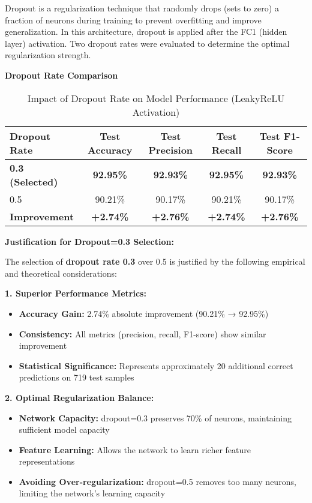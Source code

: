 \documentclass[12pt,a4paper]{article}
\begin{document}
Dropout is a regularization technique that randomly drops (sets to zero) a fraction of neurons during training to prevent overfitting and improve generalization. In this architecture, dropout is applied after the FC1 (hidden layer) activation. Two dropout rates were evaluated to determine the optimal regularization strength.

\textbf{Dropout Rate Comparison}

\begin{table}[H]
\centering
\caption{Impact of Dropout Rate on Model Performance (LeakyReLU Activation)}
\begin{tabular}{lcccc}
\toprule
\textbf{Dropout Rate} & \textbf{Test Accuracy} & \textbf{Test Precision} & \textbf{Test Recall} & \textbf{Test F1-Score} \\
\midrule
\textbf{0.3 (Selected)} & \textbf{92.95\%} & \textbf{92.93\%} & \textbf{92.95\%} & \textbf{92.93\%} \\
0.5 & 90.21\% & 90.17\% & 90.21\% & 90.17\% \\
\midrule
\textbf{Improvement} & \textbf{+2.74\%} & \textbf{+2.76\%} & \textbf{+2.74\%} & \textbf{+2.76\%} \\
\bottomrule
\end{tabular}
\end{table}

\textbf{Justification for Dropout=0.3 Selection:}

The selection of \textbf{dropout rate 0.3} over 0.5 is justified by the following empirical and theoretical considerations:

\textbf{1. Superior Performance Metrics:}
\begin{itemize}
    \item \textbf{Accuracy Gain:} 2.74\% absolute improvement (90.21\% → 92.95\%)
    \item \textbf{Consistency:} All metrics (precision, recall, F1-score) show similar improvement
    \item \textbf{Statistical Significance:} Represents approximately 20 additional correct predictions on 719 test samples
\end{itemize}

\textbf{2. Optimal Regularization Balance:}
\begin{itemize}
    \item \textbf{Network Capacity:} dropout=0.3 preserves 70\% of neurons, maintaining sufficient model capacity
    \item \textbf{Feature Learning:} Allows the network to learn richer feature representations
    \item \textbf{Avoiding Over-regularization:} dropout=0.5 removes too many neurons, limiting the network's learning capacity
\end{itemize}
\end{document}

